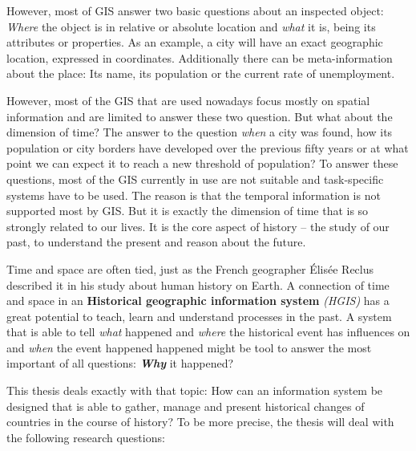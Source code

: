 However, most of GIS answer two basic questions about an inspected object: \emph{Where} the object is in relative or absolute location and \emph{what} it is, being its attributes or properties. As an example, a city will have an exact geographic location, expressed in coordinates. Additionally there can be meta-information about the place: Its name, its population or the current rate of unemployment.


However, most of the GIS that are used nowadays focus mostly on spatial information and are limited to answer these two question. But what about the dimension of time? The answer to the question \emph{when} a city was found, how its population or city borders have developed over the previous fifty years or at what point we can expect it to reach a new threshold of population? To answer these questions, most of the GIS currently in use are not suitable and task-specific systems have to be used. The reason is that the temporal information is not supported most by GIS. But it is exactly the dimension of time that is so strongly related to our lives. It is the core aspect of history -- the study of our past, to understand the present and reason about the future.

Time and space are often tied, just as the French geographer Élisée Reclus described it in his study about human history on Earth. A connection of time and space in an \textbf{Historical geographic information system} \emph{(HGIS)} has a great potential to teach, learn and understand processes in the past. A system that is able to tell \emph{what} happened and \emph{where} the historical event has influences on and \emph{when} the event happened happened might be tool to answer the most important of all questions: \textbf{\emph{Why}} it happened?

This thesis deals exactly with that topic: How can an information system be designed that is able to gather, manage and present historical changes of countries in the course of history? To be more precise, the thesis will deal with the following research questions:

